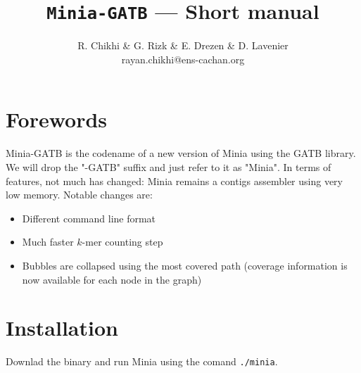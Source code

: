 \documentclass[a4paper]{article}
\begin{document}
\newcommand\vitem[1][]{\SaveVerb[%
    aftersave={\item[\textnormal{\UseVerb[#1]{vsave}}]}]{vsave}}

\title{\Huge \texttt{Minia-GATB} --- Short manual}

\author{R. Chikhi \& G. Rizk \& E. Drezen \& D. Lavenier\\
        {\small{rayan.chikhi@ens-cachan.org}}}
\maketitle

\begin{abstract}
\end{abstract}

\tableofcontents

\section{Forewords}

Minia-GATB is the codename of a new version of Minia using the GATB library. We will drop the "-GATB" suffix and just refer to it as "Minia". 
In terms of features, not much has changed: Minia remains a contigs assembler using very low memory. Notable changes are:
\begin{itemize}
    \item Different command line format 
    \item Much faster $k$-mer counting step
    \item Bubbles are collapsed using the most covered path (coverage information is now available for each node in the graph)
\end{itemize}

\section{Installation}

Downlad the binary and run Minia using the comand \verb+./minia+.
\end{document}
